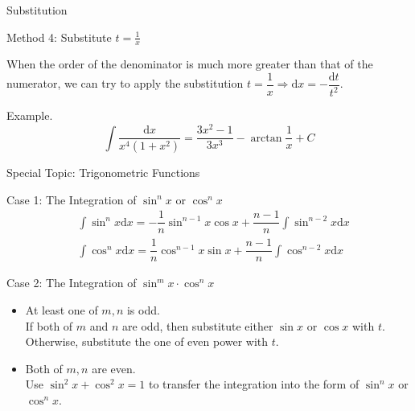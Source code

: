 \documentclass{beamer}
\begin{document}
    \begin{frame}[t]{Substitution}
        \begin{block}{Method 4: Substitute $t = \frac{1}{x}$}
            \par When the order of the denominator is much more greater than that of the numerator, we can try to apply the substitution $t = \dfrac{1}{x} \Rightarrow \mathrm{d}x = - \dfrac{\mathrm{d}t}{t^2}$.
        \end{block}
        \par \textcolor{yy}{Example.} $$\int \dfrac{\mathrm{d}x}{x^{4}\left(1+x^{2}\right)} =\dfrac{3 x^{2}-1}{3 x^{3}}-\arctan \dfrac{1}{x}+C$$
    \end{frame}

    \begin{frame}[t]{Special Topic: Trigonometric Functions}
        \begin{block}{Case 1: The Integration of $\sin^n x$ or $\cos^nx$}
        \begin{equation*}
            \begin{aligned}
                & \int \sin ^{n} x \mathrm{d} x=-\dfrac{1}{n} \sin ^{n-1} x \cos x+\dfrac{n-1}{n} \int \sin ^{n-2} x \mathrm{d} x \\
                & \int \cos ^{n} x \mathrm{d} x=\dfrac{1}{n} \cos ^{n-1} x \sin x+\dfrac{n-1}{n} \int \cos ^{n-2} x \mathrm{d} x
            \end{aligned}
        \end{equation*}
        \end{block}

        \begin{block}{Case 2: The Integration of $\sin^mx\cdot\cos^nx$}
            \begin{itemize}
                \item At least one of $m,n$ is {odd}.\\
                    If both of $m$ and $n$ are odd, then substitute either $\sin x$ or $\cos x$ with $t$. Otherwise, substitute the one of even power with $t$.
                \item Both of $m,n$ are {even}.\\
                    Use $\sin^2 x+\cos^2 x=1$ to transfer the integration into the form of $\sin^n x$ or $\cos^n x$.
            \end{itemize}
        \end{block}
    \end{frame}
\end{document}
